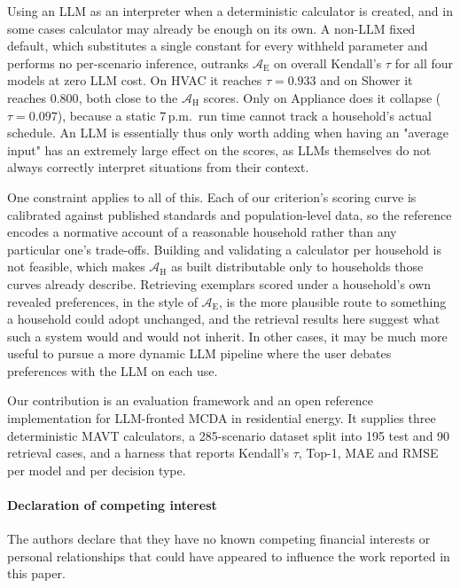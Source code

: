 \documentclass[final,3p,times]{elsarticle}
\begin{document}
Using an LLM as an interpreter when a deterministic calculator is created, and in some cases calculator may already be enough on its own. A non-LLM fixed default, which substitutes a single constant for every withheld parameter and performs no per-scenario inference, outranks $\mathcal{A}_{\text{E}}$ on overall Kendall's $\tau$ for all four models at zero LLM cost. On HVAC it reaches $\tau = 0.933$ and on Shower it reaches $0.800$, both close to the $\mathcal{A}_{\text{H}}$ scores. Only on Appliance does it collapse ($\tau = 0.097$), because a static 7\,p.m.\ run time cannot track a household's actual schedule. An LLM is essentially thus only worth adding when having an "average input" has an extremely large effect on the scores, as LLMs themselves do not always correctly interpret situations from their context. 

One constraint applies to all of this. Each of our criterion's scoring curve is calibrated against published standards and population-level data, so the reference encodes a normative account of a reasonable household rather than any particular one's trade-offs. Building and validating a calculator per household is not feasible, which makes $\mathcal{A}_{\text{H}}$ as built distributable only to households those curves already describe. Retrieving exemplars scored under a household's own revealed preferences, in the style of $\mathcal{A}_{\text{E}}$, is the more plausible route to something a household could adopt unchanged, and the retrieval results here suggest what such a system would and would not inherit. In other cases, it may be much more useful to pursue a more dynamic LLM pipeline where the user debates preferences with the LLM on each use.

Our  contribution is an evaluation framework and an open reference implementation for LLM-fronted MCDA in residential energy. It supplies three deterministic MAVT calculators, a 285-scenario dataset split into 195 test and 90 retrieval cases, and a harness that reports Kendall's $\tau$, Top-1, MAE and RMSE per model and per decision type. 

\clearpage

\paragraph*{Declaration of competing interest}
The authors declare that they have no known competing financial interests or personal relationships that could have appeared to influence the work reported in this paper.
\end{document}
